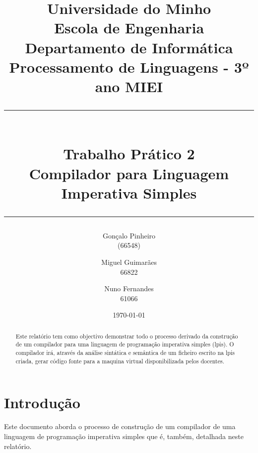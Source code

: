 \documentclass{report}
\begin{document}
\title{Universidade do Minho\\Escola de Engenharia\\Departamento de Informática\\Processamento de Linguagens - 3º ano MIEI\\ \rule{15cm}{1pt}\\ \textbf{Trabalho Prático 2} \\ Compilador para Linguagem Imperativa Simples \rule{15cm}{1pt}}

\author{Gonçalo Pinheiro\\ (66548) \and Miguel Guimarães\\ 66822 \and Nuno Fernandes\\ 61066}

\date{\today}

\maketitle

\begin{abstract}
Este relatório tem como objectivo demonstrar todo o processo derivado da construção de um compilador para uma linguagem de programação imperativa simples (lpis). O compilador irá, através da análise sintática e semântica de um ficheiro escrito na lpis criada, gerar código fonte para a maquina virtual disponibilizada pelos docentes.
\end{abstract}

\tableofcontents

\newpage

\chapter{Introdução} \label{intro}
Este documento aborda o processo de construção de um compilador de uma linguagem de programação imperativa simples que é, também, detalhada neste relatório.
\end{document}
